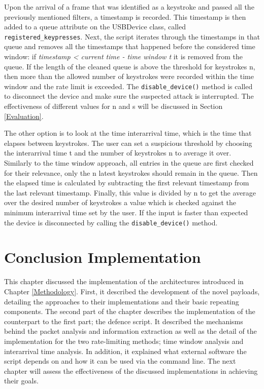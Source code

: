 Upon the arrival of a frame that was identified as a keystroke and passed all the previously mentioned filters, a timestamp is recorded. This timestamp is then added to a queue attribute on the USBDevice class, called \verb|registered_keypresses|. Next, the script iterates through the timestamps in that queue and removes all the timestamps that happened before the considered time window: if \emph{timestamp < current time - time window t} it is removed from the queue. If the length of the cleaned queue is above the threshold for keystrokes n, then more than the allowed number of keystrokes were recorded within the time window and the rate limit is exceeded. The \verb|disable_device()| method is called to disconnect the device and make sure the suspected attack is interrupted. The effectiveness of different values for n and s will be discussed in Section \ref{Evaluation}. 


The other option is to look at the time interarrival time, which is the time that elapses between keystrokes. The user can set a suspicious threshold by choosing the interarrival time t and the number of keystrokes n to average it over. Similarly to the time window approach, all entries in the queue are first checked for their relevance, only the n latest keystrokes should remain in the queue. Then the elapsed time is calculated by subtracting the first relevant timestamp from the last relevant timestamp. Finally, this value is divided by n to get the average over the desired number of keystrokes a value which is checked against the minimum interarrival time set by the user. If the input is faster than expected the device is disconnected by calling the \verb|disable_device()| method. 




\section{Conclusion Implementation}

This chapter discussed the implementation of the architectures introduced in Chapter \ref{Methodology}. First, it described the development of the novel payloads, detailing the approaches to their implementations and their basic repeating components. The second part of the chapter describes the implementation of the counterpart to the first part; the defence script. It described the mechanisms behind the packet analysis and information extraction as well as the detail of the implementation for the two rate-limiting methods; time window analysis and interarrival time analysis. In addition, it explained what external software the script depends on and how it can be used via the command line. The next chapter will assess the effectiveness of the discussed implementations in achieving their goals.   

